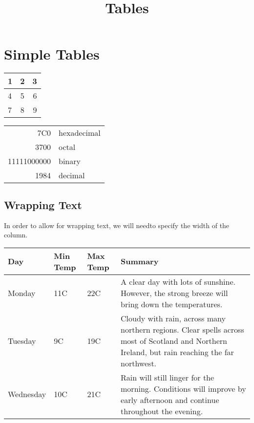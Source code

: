 \documentclass{article}
\title{Tables}
\date{}
\begin{document}
	\maketitle
	\section{Simple Tables}	
	\begin{center}
		\begin{tabular}{ | l | c | r |}
			\hline
			1 & 2 & 3 \\ \hline
			4 & 5 & 6 \\ \hline
			7 & 8 & 9 \\
			\hline
		\end{tabular}
	\end{center}
	
	
	\begin{tabular}{|r|l|}
		\hline
		7C0 & hexadecimal \\
		3700 & octal \\ \cline{2-2}
		11111000000 & binary \\
		\hline \hline
		1984 & decimal \\
		\hline
	\end{tabular}

	\subsection{Wrapping Text}
	In order to allow for wrapping text, we will needto specify the width of the column. 
	
	\begin{center}
		\begin{tabular}{ | l | l | l | p{5cm} |}
			\hline
			Day & Min Temp & Max Temp & Summary \\ \hline
			Monday & 11C & 22C & A clear day with lots of sunshine.  
			However, the strong breeze will bring down the temperatures. \\ \hline
			Tuesday & 9C & 19C & Cloudy with rain, across many northern regions. Clear spells 
			across most of Scotland and Northern Ireland, 
			but rain reaching the far northwest. \\ \hline
			Wednesday & 10C & 21C & Rain will still linger for the morning. 
			Conditions will improve by early afternoon and continue 
			throughout the evening. \\
			\hline
		\end{tabular}
	\end{center}
	
\end{document}
